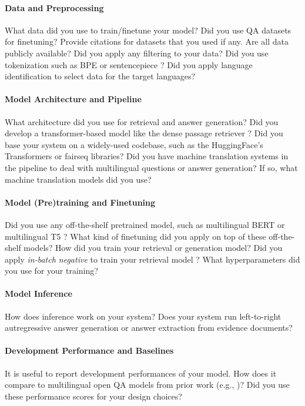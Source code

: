 \documentclass[11pt]{article}
\begin{document}
\paragraph{Data and Preprocessing}
What data did you use to train/finetune your model?
Did you use QA datasets for finetuning?
Provide citations for datasets that you used if any.
Are all data publicly available?
Did you apply any filtering to your data? 
Did you use tokenization such as BPE \cite{sennrich-etal-2016-neural} or sentencepiece \cite{kudo-richardson-2018-sentencepiece}?
Did you apply language identification to select data for the target languages? 


\paragraph{Model Architecture and Pipeline}
What architecture did you use for retrieval and answer generation?
Did you develop a transformer-based model like the dense passage retriever \cite{karpukhin2020dense}?
Did you base your system on a widely-used codebase, such as the HuggingFace's Transformers \cite{wolf-etal-2020-transformers} or fairseq \cite{ott2019fairseq} libraries?
Did you have machine translation systems in the pipeline to deal with multilingual questions or answer generation?
If so, what machine translation models did you use?

\paragraph{Model (Pre)training and Finetuning}
Did you use any off-the-shelf pretrained model, such as multilingual BERT \cite{devlin2018bert} or multilingual T5 \cite{xue2020mt5}?
What kind of finetuning did you apply on top of these off-the-shelf models?
How did you train your retrieval or generation model?
Did you apply \textit{in-batch negative} to train your retrieval model \cite{gillick-etal-2019-learning,karpukhin2020dense}? 
What hyperparameters did you use for your training?


\paragraph{Model Inference}
How does inference work on your system? 
Does your system run left-to-right autregressive answer generation or answer extraction from evidence documents?

\paragraph{Development Performance and Baselines}
It is useful to report development performances of your model.
How does it compare to multilingual open QA models from prior work (e.g., \citealp{asai-etal-2021-xor,asai2021cora})?
Did you use these performance scores for your design choices?
\end{document}
